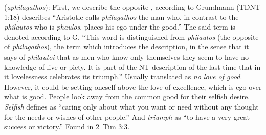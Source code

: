 \item[Selfish triumph,]

(\textit{aphilagathos}):
First, we describe the opposite , according to Grundmann (TDNT 1:18) describes ``Aristotle calls \emph{philagathos} the man who, in contrast to the \emph{philautos} who is \emph{phaulos}, places his ego under the good.'' The said term is denoted according to G. ``This word is distinguished from \emph{philautos} (the opposite of  \emph{philagathos}),  the term which introduces the description, in the sense  that it says of \emph{philautoi} that as men who know only themselves they seem to have no knowledge of live or piety. It is part of the NT description of the last time that in it lovelessness celebrates its triumph.'' Usually translated as \emph{no love of good}. However, it could be setting oneself above the love of excellence, which is ego over what is good. People look away from the common good for their selfish desire. \emph{Selfish} defines as ``caring only about what you want or need without any thought for the needs or wishes of other people.'' And \emph{triumph} as ``to have a very great success or victory.''
Found in 2~Tim 3:3.

